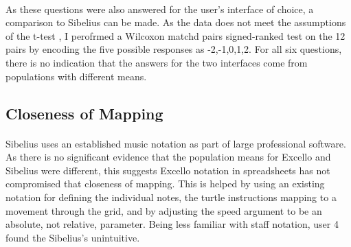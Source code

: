\label{evaluation:cdnQuestions}

\paragraph{} As these questions were also answered for the user's interface of choice, a comparison to Sibelius can be made. As the data does not meet the assumptions of the t-test \cite{barry:likert}, I perofrmed a Wilcoxon matchd pairs signed-ranked test on the 12 pairs by encoding the five possible responses as -2,-1,0,1,2. For all six questions, there is no indication that the answers for the two interfaces come from populations with different means.

\subsection{Closeness of Mapping}

\paragraph{} Sibelius uses an established music notation as part of large professional software. As there is no significant evidence that the population means for Excello and Sibelius were different, this suggests Excello notation in spreadsheets has not compromised that closeness of mapping. This is helped by using an existing notation for defining the individual notes, the turtle instructions mapping to a movement through the grid, and by adjusting the speed argument to be an absolute, not relative, parameter. Being less familiar with staff notation, user 4 found the Sibelius's unintuitive.

